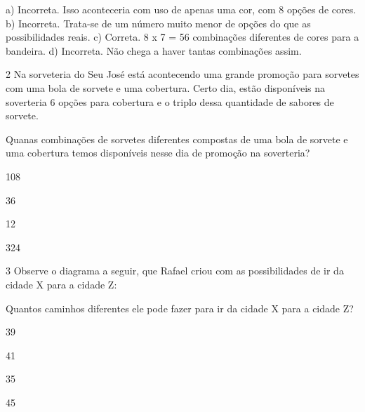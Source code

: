 {{a) Incorreta. Isso aconteceria com uso de apenas uma cor, com 8 opções de cores.
b) Incorreta. Trata-se de um número muito menor de opções do que as possibilidades reais.
c) Correta. 8 x 7 = 56 combinações diferentes de cores para a bandeira.
d) Incorreta. Não chega a haver tantas combinações assim.}


\num{2} Na sorveteria do Seu José está acontecendo uma grande promoção
para sorvetes com uma bola de sorvete e uma cobertura. Certo dia, estão disponíveis na soverteria 6 opções para cobertura e o triplo dessa quantidade de sabores de sorvete.

Quanas combinações de sorvetes diferentes compostas de uma bola de
sorvete e uma cobertura temos disponíveis nesse dia de promoção na soverteria?

\begin{escolha}
\item
  108
\item
  36
\item
  12
\item
  324
\end{escolha}


\num{3} Observe o diagrama a seguir, que Rafael criou com as possibilidades de ir da cidade X para a cidade Z:

%

Quantos caminhos diferentes ele pode fazer para ir da cidade X para a
cidade Z?

\begin{escolha}
\item
  39
\item
  41
\item
  35
\item
  45
\end{escolha}

}
